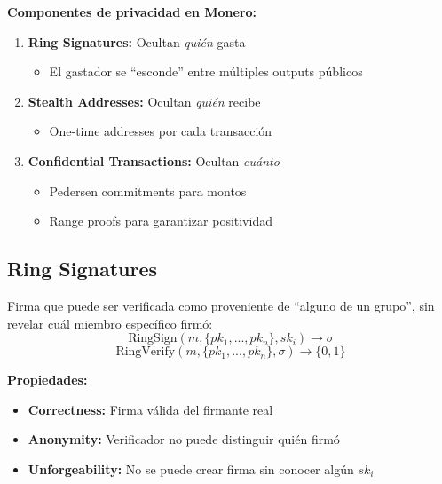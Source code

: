 \documentclass[11pt,a4paper,twoside]{book}
\begin{document}
\begin{keyidea}
\textbf{Componentes de privacidad en Monero:}

\begin{enumerate}
    \item \textbf{Ring Signatures:} Ocultan \textit{qui\'en} gasta
    \begin{itemize}
        \item El gastador se ``esconde'' entre m\'ultiples outputs p\'ublicos
    \end{itemize}
    
    \item \textbf{Stealth Addresses:} Ocultan \textit{qui\'en} recibe
    \begin{itemize}
        \item One-time addresses por cada transacci\'on
    \end{itemize}
    
    \item \textbf{Confidential Transactions:} Ocultan \textit{cu\'anto}
    \begin{itemize}
        \item Pedersen commitments para montos
        \item Range proofs para garantizar positividad
    \end{itemize}
\end{enumerate}
\end{keyidea}

\subsection{Ring Signatures}

\begin{definition}
Firma que puede ser verificada como proveniente de ``alguno de un grupo'', sin revelar cu\'al miembro espec\'ifico firm\'o:
\[
\text{RingSign}(m, \{pk_1, ..., pk_n\}, sk_i) \to \sigma
\]
\[
\text{RingVerify}(m, \{pk_1, ..., pk_n\}, \sigma) \to \{0, 1\}
\]

\textbf{Propiedades:}
\begin{itemize}
    \item \textbf{Correctness:} Firma v\'alida del firmante real
    \item \textbf{Anonymity:} Verificador no puede distinguir qui\'en firm\'o
    \item \textbf{Unforgeability:} No se puede crear firma sin conocer alg\'un $sk_i$
\end{itemize}
\end{definition}
\end{document}
